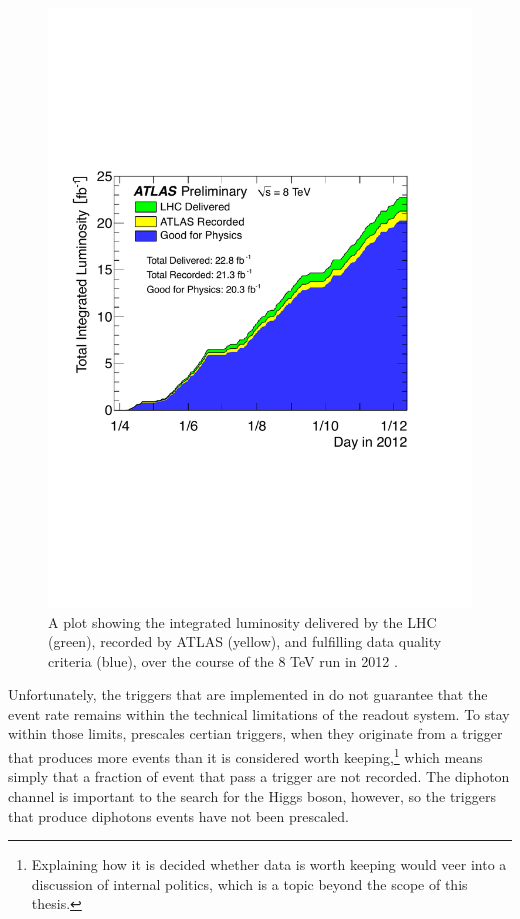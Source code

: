 \begin{figure}[htp]
\begin{minipage}[b]{.69\textwidth}
\hspace{-1em}\includegraphics[width=\textwidth]{figures/intlumi}
\end{minipage}\hfill\begin{minipage}[b]{.3\textwidth}
\caption{A plot showing the integrated luminosity delivered by the LHC (green), recorded by ATLAS (yellow), and fulfilling data quality criteria (blue), over the course of the 8 TeV run in 2012 \cite{publiclumi}.
\label{intlumi}}
\end{minipage}
\end{figure}

Unfortunately, the triggers that are implemented in \atlas{} do not guarantee that the event rate remains within the technical limitations of the readout system. To stay within those limits, \atlas{} prescales certian triggers, when they originate from a trigger that produces more events than it is considered worth keeping,\footnote{Explaining how it is decided whether data is worth keeping would veer into a discussion of \atlas{} internal politics, which is a topic beyond the scope of this thesis.} which means simply that a fraction of event that pass a trigger are not recorded. The diphoton channel is important to the search for the Higgs boson, however, so the triggers that produce diphotons events have not been prescaled.



